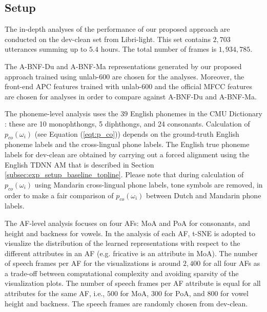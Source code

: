 \documentclass[transmag]{IEEEtran}
\begin{document}
\subsection{Setup}
The in-depth analyses of the performance of  our proposed approach are conducted on the dev-clean set from Libri-light. This set contains $2,703$ utterances summing up to $5.4$ hours. The total number of frames is
$1,934,785$.

The A-BNF-Du and A-BNF-Ma representations generated by our proposed approach trained using unlab-600  are chosen for the analyses. Moreover, the front-end APC features trained with unlab-600 and the official MFCC features are chosen for analyses in order to compare against A-BNF-Du and A-BNF-Ma.  

The phoneme-level analysis uses the $39$ English phonemes in the CMU Dictionary \cite{cmu}: these are 10 monophthongs, 5 diphthongs, and 24 consonants. Calculation of $p_{co} (\omega_i)$ (see Equation (\ref{eqt:p_co})) depends on the ground-truth English phoneme labels and the cross-lingual phone labels. The English true phoneme labels for dev-clean are obtained by carrying out a forced alignment using the English TDNN AM that is described in Section \ref{subsec:exp_setup_baseline_topline}. Please note that during calculation of $p_{co} (\omega_i)$ using Mandarin cross-lingual phone labels, tone symbols are removed, in order to  make a fair comparison of $p_{co} (\omega_i)$ between Dutch and Mandarin phone labels.


The AF-level analysis focuses on four AFs: MoA and PoA for consonants, and height and backness for vowels. In the analysis of each AF, t-SNE  \cite{maaten2008visualizing} is adopted to visualize the distribution of the learned representations with respect to the different attributes in an AF (e.g. fricative is an attribute in MoA). The number of speech frames per AF for the visualizations is around $2,400$ for all four AFs as a trade-off between computational complexity and avoiding sparsity of the visualization plots. The number of speech frames per AF attribute is equal for all attributes for the same AF, i.e., $500$ for MoA, $300$ for PoA, and $800$ for vowel height and backness. The speech frames are randomly chosen from dev-clean. %
\end{document}
